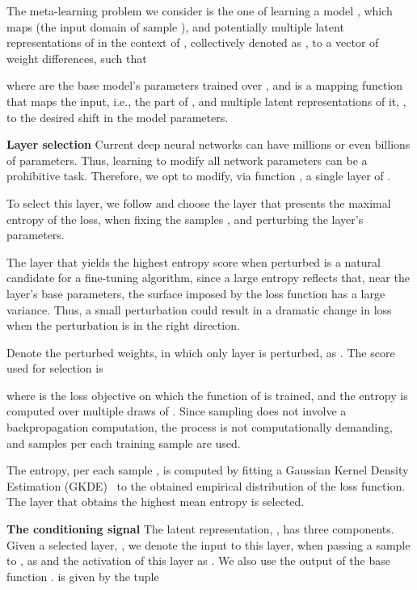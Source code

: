 \documentclass{article}
\theoremstyle{plain}
\begin{document}
The meta-learning problem we consider is the one of learning a model , which maps  (the input domain of sample ), and potentially multiple latent representations of  in the context of , collectively denoted as , to a vector of weight differences, such that

 where  are the base model's parameters trained over , and  is a mapping function that maps the input, i.e., the  part of , and multiple latent representations of it, , to the desired shift in the model parameters.

{\bf Layer selection\quad}  Current deep neural networks can have millions or even billions of parameters. Thus, learning to modify all network parameters can be a prohibitive task. Therefore, we opt to modify, via function , a single layer of . 

To select this layer, we follow \citet{lutati2021hyperhypernetwork} and choose the layer that presents the maximal entropy of the loss, when fixing the samples , and perturbing the layer's parameters.

The layer that yields the highest entropy score when perturbed is a natural candidate for a fine-tuning algorithm, since a large entropy reflects that, near the layer's base parameters, the surface imposed by the loss function has a large variance. Thus, a small perturbation could result in a dramatic change in loss when the perturbation is in the right direction.

Denote the perturbed weights, in which only layer  is perturbed, as . The score used for selection is

where  is the loss objective on which the function of  is trained, and the entropy is computed over multiple draws of . Since sampling does not involve a backpropagation computation, the process is not computationally demanding, and  samples per each training sample  are used.

The entropy, per each sample , is computed by fitting a Gaussian Kernel Density Estimation (GKDE)~\citep{Silverman86} to the obtained empirical distribution of the loss function. The layer that obtains the highest mean entropy is selected.


{\bf The conditioning signal\quad} The latent representation, , has three components. Given a selected layer, , we denote the input to this layer, when passing a sample  to , as  and the activation of this layer as . We also use the output of the base function .  is given by the tuple
\end{document}
